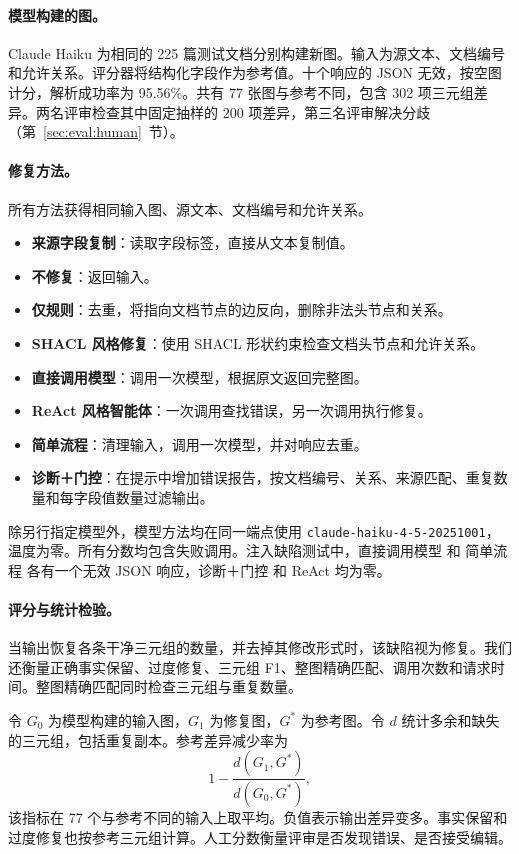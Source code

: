 \paragraph{模型构建的图。}
Claude Haiku 为相同的 225 篇测试文档分别构建新图。输入为源文本、文档编号和允许关系。评分器将结构化字段作为参考值。十个响应的 JSON 无效，按空图计分，解析成功率为 95.56\%。共有 77 张图与参考不同，包含 302 项三元组差异。两名评审检查其中固定抽样的 200 项差异，第三名评审解决分歧（第~\ref{sec:eval:human}~节）。

\paragraph{修复方法。}
所有方法获得相同输入图、源文本、文档编号和允许关系。
\begin{itemize}
    \item \textbf{来源字段复制}：读取字段标签，直接从文本复制值。
    \item \textbf{不修复}：返回输入。
    \item \textbf{仅规则}：去重，将指向文档节点的边反向，删除非法头节点和关系。
    \item \textbf{SHACL 风格修复}：使用 SHACL 形状约束检查文档头节点和允许关系\citep{ref_shacl2017}。
    \item \textbf{直接调用模型}：调用一次模型，根据原文返回完整图。
    \item \textbf{ReAct 风格智能体}：一次调用查找错误，另一次调用执行修复\citep{ref_yao2023react}。
    \item \textbf{简单流程}：清理输入，调用一次模型，并对响应去重。
    \item \textbf{诊断＋门控}：在提示中增加错误报告，按文档编号、关系、来源匹配、重复数量和每字段值数量过滤输出。
\end{itemize}

除另行指定模型外，模型方法均在同一端点使用 \texttt{claude-haiku-4-5-20251001}\citep{ref_anthropic_claude45}，温度为零。所有分数均包含失败调用。注入缺陷测试中，直接调用模型 和 简单流程 各有一个无效 JSON 响应，诊断＋门控 和 ReAct 均为零。

\paragraph{评分与统计检验。}
当输出恢复各条干净三元组的数量，并去掉其修改形式时，该缺陷视为修复。我们还衡量正确事实保留、过度修复、三元组 F1、整图精确匹配、调用次数和请求时间。整图精确匹配同时检查三元组与重复数量。

令 $G_0$ 为模型构建的输入图，$G_1$ 为修复图，$G^*$ 为参考图。令 $d$ 统计多余和缺失的三元组，包括重复副本。参考差异减少率为
\[
    1-\frac{d(G_1,G^*)}{d(G_0,G^*)},
\]
该指标在 77 个与参考不同的输入上取平均。负值表示输出差异变多。事实保留和过度修复也按参考三元组计算。人工分数衡量评审是否发现错误、是否接受编辑。

